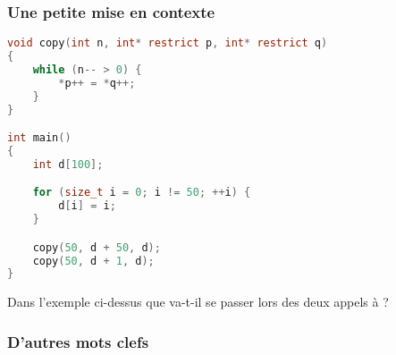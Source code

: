\documentclass{cppcourses}
\begin{document}
\begin{frame}[fragile]

\frametitle{Une petite mise en contexte}

\begin{example}

\begin{lstlisting}[language = c]
void copy(int n, int* restrict p, int* restrict q)
{
    while (n-- > 0) {
        *p++ = *q++;
    }
}

int main()
{
    int d[100];

    for (size_t i = 0; i != 50; ++i) {
        d[i] = i;
    }

    copy(50, d + 50, d);
    copy(50, d + 1, d);
}
\end{lstlisting}

Dans l'exemple ci-dessus que va-t-il se passer lors des deux appels à  ?


\end{example}

\end{frame}

\subsubsection{D'autres mots clefs}
\end{document}
